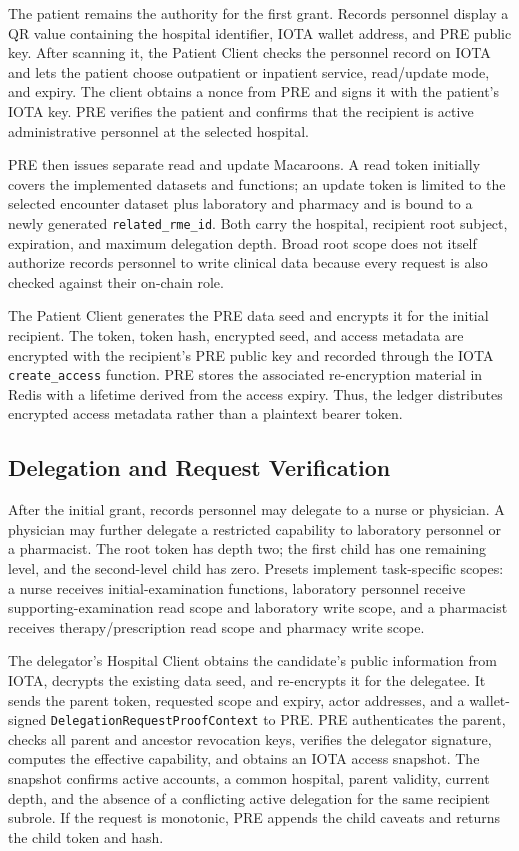 The patient remains the authority for the first grant. Records personnel display a QR value containing the hospital identifier, IOTA wallet address, and PRE public key. After scanning it, the Patient Client checks the personnel record on IOTA and lets the patient choose outpatient or inpatient service, read/update mode, and expiry. The client obtains a nonce from PRE and signs it with the patient's IOTA key. PRE verifies the patient and confirms that the recipient is active administrative personnel at the selected hospital.

PRE then issues separate read and update Macaroons. A read token initially covers the implemented datasets and functions; an update token is limited to the selected encounter dataset plus laboratory and pharmacy and is bound to a newly generated \texttt{related\_rme\_id}. Both carry the hospital, recipient root subject, expiration, and maximum delegation depth. Broad root scope does not itself authorize records personnel to write clinical data because every request is also checked against their on-chain role.

The Patient Client generates the PRE data seed and encrypts it for the initial recipient. The token, token hash, encrypted seed, and access metadata are encrypted with the recipient's PRE public key and recorded through the IOTA \texttt{create\_access} function. PRE stores the associated re-encryption material in Redis with a lifetime derived from the access expiry. Thus, the ledger distributes encrypted access metadata rather than a plaintext bearer token.

\subsection{Delegation and Request Verification}

After the initial grant, records personnel may delegate to a nurse or physician. A physician may further delegate a restricted capability to laboratory personnel or a pharmacist. The root token has depth two; the first child has one remaining level, and the second-level child has zero. Presets implement task-specific scopes: a nurse receives initial-examination functions, laboratory personnel receive supporting-examination read scope and laboratory write scope, and a pharmacist receives therapy/prescription read scope and pharmacy write scope.

The delegator's Hospital Client obtains the candidate's public information from IOTA, decrypts the existing data seed, and re-encrypts it for the delegatee. It sends the parent token, requested scope and expiry, actor addresses, and a wallet-signed \texttt{DelegationRequestProofContext} to PRE. PRE authenticates the parent, checks all parent and ancestor revocation keys, verifies the delegator signature, computes the effective capability, and obtains an IOTA access snapshot. The snapshot confirms active accounts, a common hospital, parent validity, current depth, and the absence of a conflicting active delegation for the same recipient subrole. If the request is monotonic, PRE appends the child caveats and returns the child token and hash.

